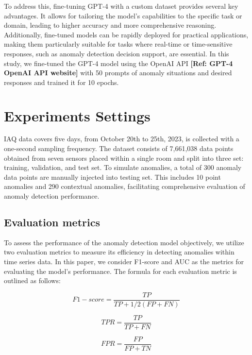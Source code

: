\documentclass[final,3p,times,twocolumn]{elsarticle}
\begin{document}
To address this, fine-tuning GPT-4 with a custom dataset provides several key advantages. It allows for tailoring the model's capabilities to the specific task or domain, leading to higher accuracy and more comprehensive reasoning. Additionally, fine-tuned models can be rapidly deployed for practical applications, making them particularly suitable for tasks where real-time or time-sensitive responses, such as anomaly detection decision support, are essential. In this study, we fine-tuned the GPT-4 model using the OpenAI API \textbf{[Ref: GPT-4 OpenAI API website]} with 50 prompts of anomaly situations and desired responses and trained it for 10 epochs.

\section{Experiments Settings}\label{sec3}
IAQ data covers five days, from October 20th to 25th, 2023, is collected with a one-second sampling frequency. The dataset consists of 7,661,038 data points obtained from seven sensors placed within a single room and split into three set: training, validation, and test set. To simulate anomalies, a total of 300 anomaly data points are manually injected into testing set. This includes 10 point anomalies and 290 contextual anomalies, facilitating comprehensive evaluation of anomaly detection performance.
\subsection{Evaluation metrics}
To assess the performance of the anomaly detection model objectively, we utilize two evaluation metrics to measure its efficiency in detecting anomalies within time series data. In this paper, we consider F1-score and AUC as the metrics for evaluating the model's performance. The formula for each evaluation metric is outlined as follows:
                                                                                                                                                                                            
\begin{equation}\label{eq1}
F1-score = \frac{TP}{TP+1/2(FP+FN)}
\end{equation}

\begin{equation}\label{eq2}
TPR = \frac{TP}{TP+FN}
\end{equation}

\begin{equation}\label{eq3}
FPR = \frac{FP}{FP+TN}
\end{equation}
\end{document}
